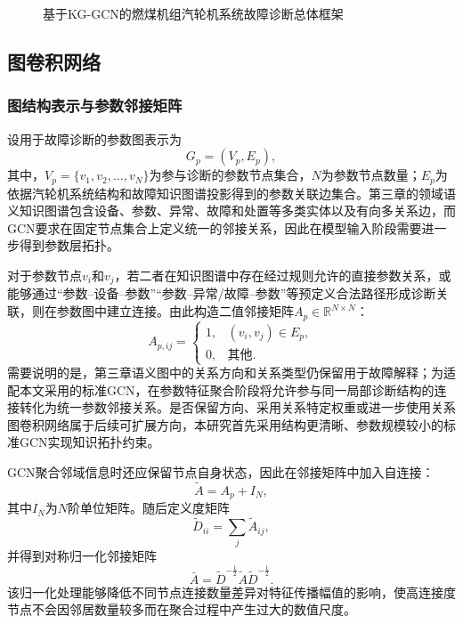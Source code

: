 \begin{figure}[htbp]
    \centering
    \caption{基于KG-GCN的燃煤机组汽轮机系统故障诊断总体框架}
    \label{fig:kg_gcn_overall}
\end{figure}

\subsection{图卷积网络}
\label{subsec:gcn_principle}

\subsubsection{图结构表示与参数邻接矩阵}

设用于故障诊断的参数图表示为
\begin{equation}
    G_p=(V_p,E_p),
\end{equation}
其中，$V_p=\{v_1,v_2,\ldots,v_N\}$为参与诊断的参数节点集合，$N$为参数节点数量；$E_p$为依据汽轮机系统结构和故障知识图谱投影得到的参数关联边集合。第三章的领域语义知识图谱包含设备、参数、异常、故障和处置等多类实体以及有向多关系边，而GCN要求在固定节点集合上定义统一的邻接关系，因此在模型输入阶段需要进一步得到参数层拓扑。

对于参数节点$v_i$和$v_j$，若二者在知识图谱中存在经过规则允许的直接参数关系，或能够通过“参数--设备--参数”“参数--异常/故障--参数”等预定义合法路径形成诊断关联，则在参数图中建立连接。由此构造二值邻接矩阵$A_p\in\mathbb{R}^{N\times N}$：
\begin{equation}
A_{p,ij}=
\begin{cases}
1, & (v_i,v_j)\in E_p,\\
0, & \text{其他}.
\end{cases}
\end{equation}
需要说明的是，第三章语义图中的关系方向和关系类型仍保留用于故障解释；为适配本文采用的标准GCN，在参数特征聚合阶段将允许参与同一局部诊断结构的连接转化为统一参数邻接关系。是否保留方向、采用关系特定权重或进一步使用关系图卷积网络属于后续可扩展方向，本研究首先采用结构更清晰、参数规模较小的标准GCN实现知识拓扑约束。

GCN聚合邻域信息时还应保留节点自身状态，因此在邻接矩阵中加入自连接：
\begin{equation}
    \tilde A=A_p+I_N,
\end{equation}
其中$I_N$为$N$阶单位矩阵。随后定义度矩阵
\begin{equation}
    \tilde D_{ii}=\sum_j\tilde A_{ij},
\end{equation}
并得到对称归一化邻接矩阵
\begin{equation}
    \bar A=\tilde D^{-\frac12}\tilde A\tilde D^{-\frac12}.
\end{equation}
该归一化处理能够降低不同节点连接数量差异对特征传播幅值的影响，使高连接度节点不会因邻居数量较多而在聚合过程中产生过大的数值尺度。

